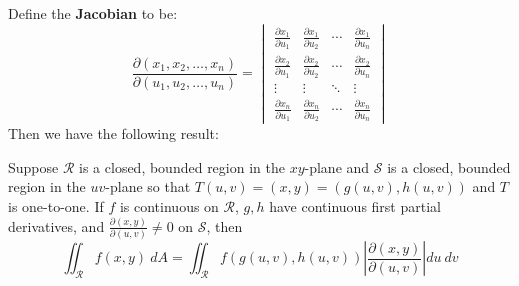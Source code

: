 \documentclass[12pt]{article}
\begin{document}
Define the \textbf{Jacobian} to be:
\[ \frac{\partial (x_1,x_2,\dots,x_n)}{\partial (u_1,u_2,\dots,u_n)} = \begin{vmatrix}
\frac{\partial x_1}{\partial u_1} & \frac{\partial x_1}{\partial u_2} & \cdots & \frac{\partial x_1}{\partial u_n} \\
\frac{\partial x_2}{\partial u_1} & \frac{\partial x_2}{\partial u_2} & \cdots & \frac{\partial x_2}{\partial u_n} \\
\vdots & \vdots & \ddots & \vdots \\
\frac{\partial x_n}{\partial u_1} & \frac{\partial x_n}{\partial u_2} & \cdots & \frac{\partial x_n}{\partial u_n}
\end{vmatrix}\]
Then we have the following result:
\begin{theorem}
Suppose $\mathcal{R}$ is a closed, bounded region in the $xy$-plane and $\mathcal{S}$ is a closed, bounded region in the $uv$-plane so that $T(u,v) = (x,y) = (g(u,v),h(u,v))$ and $T$ is one-to-one. If $f$ is continuous on $\mathcal{R}$, $g,h$ have continuous first partial derivatives, and $\frac{\partial(x,y)}{\partial (u,v)} \neq 0$ on $\mathcal{S}$, then
\[ \iint_{\mathcal{R}} f(x,y) \ dA = \iint_{\mathcal{R}}f(g(u,v),h(u,v))\left|\frac{\partial (x,y)}{\partial (u,v)}\right|  du \ dv \]
\end{theorem}
\end{document}
